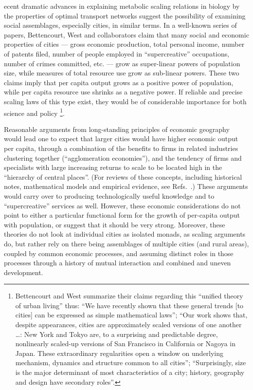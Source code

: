 \documentclass{pnastwo}
\begin{document}
\begin{article}
ecent dramatic advances in explaining metabolic scaling relations in
biology by the properties of optimal transport networks
\cite{West-Brown-Enquist-origin-of-scaling,Brown-West-scaling-in-bio} suggest
the possibility of examining social assemblages, especially cities, in similar
terms.  In a well-known series of papers, Bettencourt, West and collaborators
\cite{Bettencout-et-al-growth-innovation-scaling,Bettencourt-et-al-urban-scaling-and-its-deviations}
claim that many social and economic properties of cities --- gross economic
production, total personal income, number of patents filed, number of people
employed in ``supercreative'' \cite{Florida-rise-of-creative-class}
occupations, number of crimes committed, etc. --- grow as super-linear powers
of population size, while measures of total resource use grow as sub-linear
powers.  These two claims imply that per capita output grows as a positive
power of population, while per capita resource use shrinks as a negative power.
If reliable and precise scaling laws of this type exist, they would be of
considerable importance for both science and policy
\cite{Bettencourt-West-unified-theory-of-urban-living}\footnote{Bettencourt and
  West summarize their claims regarding this ``unified theory of urban living''
  \cite{Bettencourt-West-unified-theory-of-urban-living} thus: ``We have
  recently shown that these general trends [to cities] can be expressed as
  simple mathematical laws''; ``Our work shows that, despite appearances,
  cities are approximately scaled versions of one another \ldots: New York and
  Tokyo are, to a surprising and predictable degree, nonlinearly scaled-up
  versions of San Francisco in California or Nagoya in Japan. These
  extraordinary regularities open a window on underlying mechanism, dynamics
  and structure common to all cities''; ``Surprisingly, size is the major
  determinant of most characteristics of a city; history, geography and design
  have secondary roles''.}.

Reasonable arguments from long-standing principles of economic geography would
lead one to expect that larger cities would have higher economic output per
capita, through a combination of the benefits to firms in related industries
clustering together (``agglomeration economies''), and the tendency of firms
and specialists with large increasing returns to scale to be located high in
the ``hierarchy of central places''.  (For reviews of these concepts, including
historical notes, mathematical models and empirical evidence, see Refs.\
\cite{Krugman-self-organizing,Henderson-ZMS-Venables,Fujita-Krugman-Venables}.)
These arguments would carry over to producing technologically useful knowledge
and to ``supercreative'' services as well.  However, these economic
considerations do not point to either a particular functional form for the
growth of per-capita output with population, or suggest that it should be very
strong.  Moreover, these theories do not look at individual cities as isolated
monads, as scaling arguments do, but rather rely on there being assemblages of
multiple cities (and rural areas), coupled by common economic processes, and
assuming distinct roles in those processes through a history of mutual
interaction and combined and uneven development.


\end{article}
\end{document}
